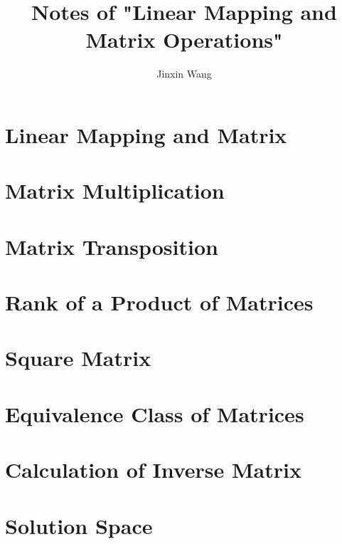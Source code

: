 \documentclass[onecolumn]{ctexart}
\title{Notes of "Linear Mapping and Matrix Operations"}
\author{Jinxin Wang}
\date{}
\begin{document}
\maketitle

\section{Linear Mapping and Matrix}

\section{Matrix Multiplication}

\section{Matrix Transposition}

\section{Rank of a Product of Matrices}

\section{Square Matrix}

\section{Equivalence Class of Matrices}

\section{Calculation of Inverse Matrix}

\section{Solution Space}
\end{document}
